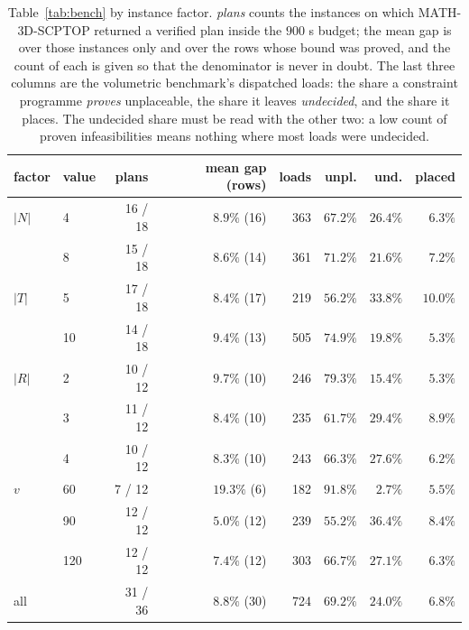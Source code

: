 \begin{table}[!htbp]
\centering
\small
\caption{Table~\ref{tab:bench} by instance factor. \emph{plans} counts
the instances on which MATH-3D-SCPTOP returned a verified plan inside
the $900$ s budget; the mean gap is over those instances only and over
the rows whose bound was proved, and the count of each is given so that
the denominator is never in doubt. The last three columns are the
volumetric benchmark's dispatched loads: the share a constraint
programme \emph{proves} unplaceable, the share it leaves
\emph{undecided}, and the share it places. The undecided share must be
read with the other two: a low count of proven infeasibilities means
nothing where most loads were undecided.}
\label{tab:summary}
\begin{tabular}{llrrrrrr}
\toprule
factor & value & plans & mean gap (rows) & loads & unpl. & und. & placed \\
\midrule
$|N|$ & 4 & 16 / 18 & $8.9\%$ (16) & 363 & $67.2\%$ & $26.4\%$ & $6.3\%$ \\
 & 8 & 15 / 18 & $8.6\%$ (14) & 361 & $71.2\%$ & $21.6\%$ & $7.2\%$ \\
\midrule
$|T|$ & 5 & 17 / 18 & $8.4\%$ (17) & 219 & $56.2\%$ & $33.8\%$ & $10.0\%$ \\
 & 10 & 14 / 18 & $9.4\%$ (13) & 505 & $74.9\%$ & $19.8\%$ & $5.3\%$ \\
\midrule
$|R|$ & 2 & 10 / 12 & $9.7\%$ (10) & 246 & $79.3\%$ & $15.4\%$ & $5.3\%$ \\
 & 3 & 11 / 12 & $8.4\%$ (10) & 235 & $61.7\%$ & $29.4\%$ & $8.9\%$ \\
 & 4 & 10 / 12 & $8.3\%$ (10) & 243 & $66.3\%$ & $27.6\%$ & $6.2\%$ \\
\midrule
$v$ & 60 & 7 / 12 & $19.3\%$ (6) & 182 & $91.8\%$ & $2.7\%$ & $5.5\%$ \\
 & 90 & 12 / 12 & $5.0\%$ (12) & 239 & $55.2\%$ & $36.4\%$ & $8.4\%$ \\
 & 120 & 12 / 12 & $7.4\%$ (12) & 303 & $66.7\%$ & $27.1\%$ & $6.3\%$ \\
\midrule
all & & 31 / 36 & $8.8\%$ (30) & 724 & $69.2\%$ & $24.0\%$ & $6.8\%$ \\
\bottomrule
\end{tabular}
\end{table}
